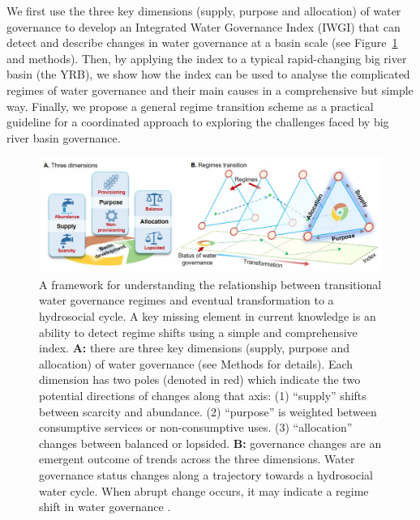 \documentclass[9pt, twocolumn, twoside, lineno]{pnas-new}
\begin{document}
\label{introduction-section-3}
We first use the three key dimensions (supply, purpose and allocation) of water governance to develop an Integrated Water Governance Index (IWGI) that can detect and describe changes in water governance at a basin scale (see Figure~\ref{fig:framework} and methods).
Then, by applying the index to a typical rapid-changing big river basin (the YRB), we show how the index can be used to analyse the complicated regimes of water governance and their main causes in a comprehensive but simple way. 
Finally, we propose a general regime transition scheme as a practical guideline for a coordinated approach to exploring the challenges faced by big river basin governance.


\begin{figure}%
	\centering
	\includegraphics[width=0.8\linewidth]{../../figures/main/framework.jpg}
	\caption{
		A framework for understanding the relationship between transitional water governance regimes and eventual transformation to a hydrosocial cycle. A key missing element in current knowledge is an ability to detect regime shifts using a simple and comprehensive index.
		\textbf{A:} there are three key dimensions (supply, purpose and allocation) of water governance (see Methods for details). Each dimension has two poles (denoted in red) which indicate the two potential directions of changes along that axis: (1) ``supply'' shifts between scarcity and abundance. (2) ``purpose'' is weighted between consumptive services or non-consumptive uses. (3) ``allocation'' changes between balanced or lopsided. 
		\textbf{B:} governance changes are an emergent outcome of trends across the three dimensions. Water governance status changes along a trajectory towards a hydrosocial water cycle. When abrupt change occurs, it may indicate a regime shift in water governance
		\cite{steffen2018,abbottwatercycleAnthropocene2019,levia2020}.
	}
	\label{fig:framework}
\end{figure}
\end{document}
